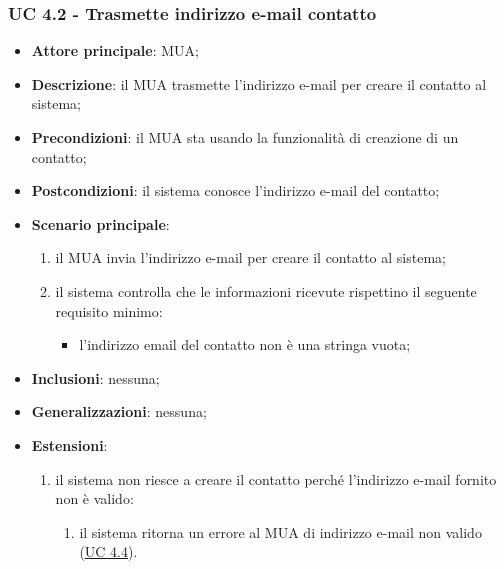     \subsubsection{UC 4.2 - Trasmette indirizzo e-mail contatto} \label{sec:UC4.2}
    \begin{itemize}
        \item \textbf{Attore principale}: MUA;
        \item \textbf{Descrizione}: il MUA trasmette l'indirizzo e-mail per creare il contatto al sistema;
        \item \textbf{Precondizioni}: il MUA sta usando la funzionalità di creazione di un contatto;
        \item \textbf{Postcondizioni}: il sistema conosce l'indirizzo e-mail del contatto;
        \item \textbf{Scenario principale}:
            \begin{enumerate}
                \item il MUA invia l'indirizzo e-mail per creare il contatto al sistema;
                \item il sistema controlla che le informazioni ricevute rispettino il seguente requisito minimo:
                    \begin{itemize}
                        \item l'indirizzo email del contatto non è una stringa vuota;
                    \end{itemize}
            \end{enumerate}
        \item \textbf{Inclusioni}: nessuna;
        \item \textbf{Generalizzazioni}: nessuna;
        \item \textbf{Estensioni}:
            \begin{enumerate}[label=\alph*.]
                \item il sistema non riesce a creare il contatto perché l'indirizzo e-mail fornito non è valido:
                \begin{enumerate}[label=\arabic*.]
                    \item il sistema ritorna un errore al MUA di indirizzo e-mail non valido (\hyperref[sec:UC4.4]{UC 4.4}).
                \end{enumerate}
            \end{enumerate}
    \end{itemize}




